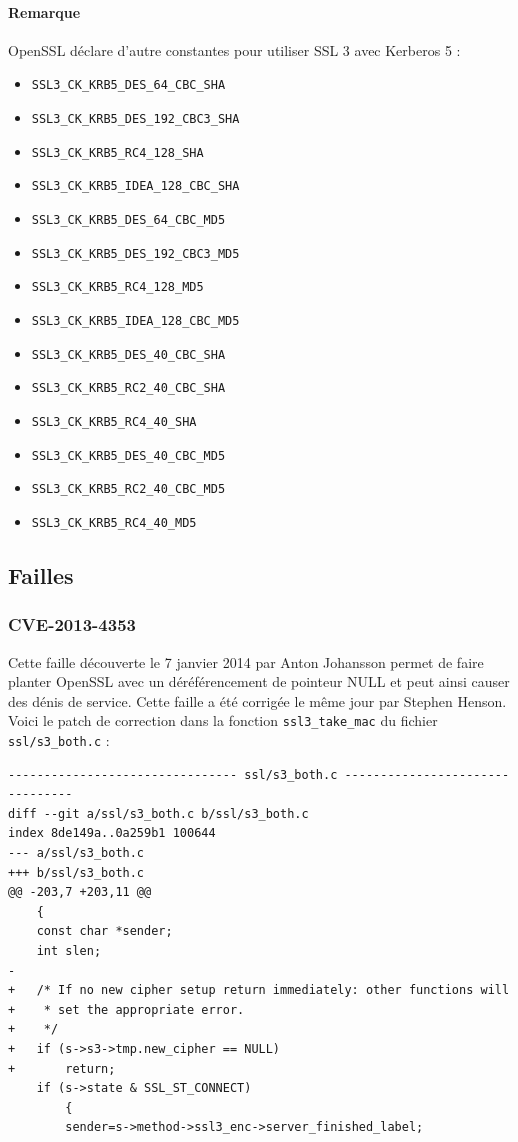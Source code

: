 \documentclass[a4paper,11pt,french]{article}
\begin{document}
\paragraph{Remarque} OpenSSL déclare d'autre constantes pour utiliser SSL 3 avec Kerberos 5 :
\begin{itemize}
\item \verb+SSL3_CK_KRB5_DES_64_CBC_SHA+
\item \verb+SSL3_CK_KRB5_DES_192_CBC3_SHA+
\item \verb+SSL3_CK_KRB5_RC4_128_SHA+
\item \verb+SSL3_CK_KRB5_IDEA_128_CBC_SHA+
\item \verb+SSL3_CK_KRB5_DES_64_CBC_MD5+
\item \verb+SSL3_CK_KRB5_DES_192_CBC3_MD5+
\item \verb+SSL3_CK_KRB5_RC4_128_MD5+
\item \verb+SSL3_CK_KRB5_IDEA_128_CBC_MD5+
\item \verb+SSL3_CK_KRB5_DES_40_CBC_SHA+
\item \verb+SSL3_CK_KRB5_RC2_40_CBC_SHA+
\item \verb+SSL3_CK_KRB5_RC4_40_SHA+
\item \verb+SSL3_CK_KRB5_DES_40_CBC_MD5+
\item \verb+SSL3_CK_KRB5_RC2_40_CBC_MD5+
\item \verb+SSL3_CK_KRB5_RC4_40_MD5+
\end{itemize}


\subsection{Failles}
\subsubsection{CVE-2013-4353}
Cette faille découverte le 7 janvier 2014 par Anton Johansson permet de faire planter OpenSSL avec un déréférencement de pointeur NULL et peut ainsi causer des dénis de service. Cette faille a été corrigée le même jour par Stephen Henson. Voici le patch de correction dans la fonction \verb+ssl3_take_mac+ du fichier \verb+ssl/s3_both.c+ :

\begin{Verbatim}
-------------------------------- ssl/s3_both.c --------------------------------
diff --git a/ssl/s3_both.c b/ssl/s3_both.c
index 8de149a..0a259b1 100644
--- a/ssl/s3_both.c
+++ b/ssl/s3_both.c
@@ -203,7 +203,11 @@
 	{
 	const char *sender;
 	int slen;
-
+	/* If no new cipher setup return immediately: other functions will
+	 * set the appropriate error.
+	 */
+	if (s->s3->tmp.new_cipher == NULL)
+		return;
 	if (s->state & SSL_ST_CONNECT)
 		{
 		sender=s->method->ssl3_enc->server_finished_label;
\end{Verbatim}
\end{document}

